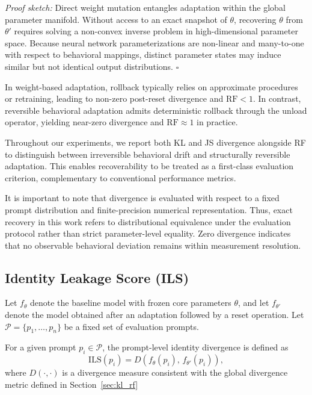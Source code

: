 \documentclass{article}
\begin{document}
	\textit{Proof sketch:}
	Direct weight mutation entangles adaptation within the global parameter manifold. Without access to an exact snapshot of $\theta$, recovering $\theta$ from $\theta'$ requires solving a non-convex inverse problem in high-dimensional parameter space. Because neural network parameterizations are non-linear and many-to-one with respect to behavioral mappings, distinct parameter states may induce similar but not identical output distributions.
	\hfill $\square$
	
	In weight-based adaptation, rollback typically relies on approximate procedures or retraining, leading to non-zero post-reset divergence and $\mathrm{RF} < 1$. In contrast, reversible behavioral adaptation admits deterministic rollback through the unload operator, yielding near-zero divergence and $\mathrm{RF} \approx 1$ in practice.
	
	Throughout our experiments, we report both KL and JS divergence alongside RF to distinguish between irreversible behavioral drift and structurally reversible adaptation. This enables recoverability to be treated as a first-class evaluation criterion, complementary to conventional performance metrics.
	
	It is important to note that divergence is evaluated with respect to a fixed prompt distribution and finite-precision numerical representation. Thus, exact recovery in this work refers to distributional equivalence under the evaluation protocol rather than strict parameter-level equality. Zero divergence indicates that no observable behavioral deviation remains within measurement resolution.
	
	\subsection{Identity Leakage Score (ILS)}
	\label{sec:ils}
	
	Let $f_{\theta}$ denote the baseline model with frozen core parameters $\theta$, and let $f_{\theta'}$ denote the model obtained after an adaptation followed by a reset operation. Let $\mathcal{P} = \{p_1, \dots, p_n\}$ be a fixed set of evaluation prompts.
	
	For a given prompt $p_i \in \mathcal{P}$, the prompt-level identity divergence is defined as
	\[
	\mathrm{ILS}(p_i) = D\!\left( f_{\theta}(p_i),\, f_{\theta'}(p_i) \right),
	\]
	where $D(\cdot,\cdot)$ is a divergence measure consistent with the global divergence metric defined in Section~\ref{sec:kl_rf}
	
\end{document}
